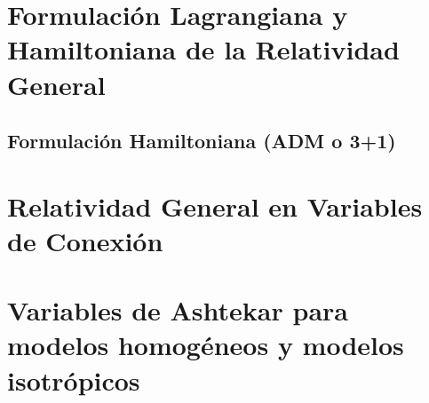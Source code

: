 \documentclass[10pt, letterpaper, spanish]{book}
\theoremstyle{definition}
\theoremstyle{plain}
\theoremstyle{remark}
\theoremstyle{break}
\begin{document}

\chapter{Formulación Lagrangiana y Hamiltoniana de la Relatividad General}
\label{chp:RG}




\section{Formulación Hamiltoniana (ADM o 3+1)}









\chapter{Relatividad General en Variables de Conexión}






\chapter{Variables de Ashtekar para modelos homogéneos y modelos isotrópicos}



\end{document}
